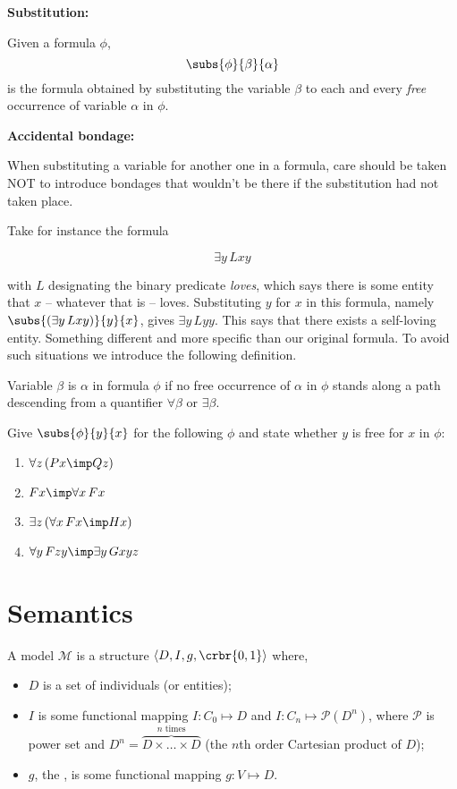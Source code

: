 \documentclass[11pt]{article}
\begin{document}
{\item[] {\bf Substitution:}

\item Given a formula $\phi$, 
$$\subs{\phi}{\beta}{\alpha}$$ is the formula obtained by substituting the variable $\beta$ to each and every \emph{free} occurrence of variable $\alpha$ in $\phi$.


\item[] {\bf Accidental bondage:}

\item When substituting a variable for another one in a formula, care should be taken NOT to introduce bondages that wouldn't be there if the substitution had not taken place.  
\item[] Take for instance the formula

$$\exists y\, Lxy$$

with $L$ designating the binary predicate \emph{loves}, which says there is some entity that $x$ -- whatever that is -- loves. Substituting $y$ for $x$ in this formula, namely $\subs{(\exists y\, Lxy)}{y}{x}$, gives $\exists y\, Lyy$. This says that there exists a self-loving entity. Something different and more specific than our original formula. To avoid such situations we introduce the following definition.

\item Variable $\beta$ is  $\alpha$ in formula $\phi$ if no free occurrence of $\alpha$ in $\phi$ stands along a path descending from a
quantifier $\forall \beta$  or $\exists \beta$.

\begin{uexercise}
Give $\subs{\phi}{y}{x}$ for the following $\phi$ and state whether $y$ is free for $x$ in $\phi$:

\begin{enumerate}
\item $\forall z\,(Px\imp Qz)$
\item $Fx \imp \forall x\, Fx$
\item $\exists z\,(\forall x\, Fx \imp Hx)$
\item $\forall y\,Fzy\imp \exists y\, Gxyz$
\end{enumerate}
\end{uexercise}

\section{Semantics}

\begin{udefinition}[Model]
A model $\mathcal{M}$ is a structure $\langle D,I,g,\crbr{0,1} \rangle$  where,
\begin{itemize}
\item $D$ is a set of individuals (or entities);
\item $I$ is some functional mapping $I: C_0 \mapsto D$  and $I: C_n \mapsto \mathcal{P}(D^n)$, where $\mathcal{P}$ is power set and $D^n = \overbrace{D\times\ldots\times D}^{n \text{ times}}$ (the $n$th order Cartesian product of $D$);
\item $g$,  the , is some functional mapping $g: V \mapsto D$.
\end{itemize}


\end{udefinition}}
\end{document}
